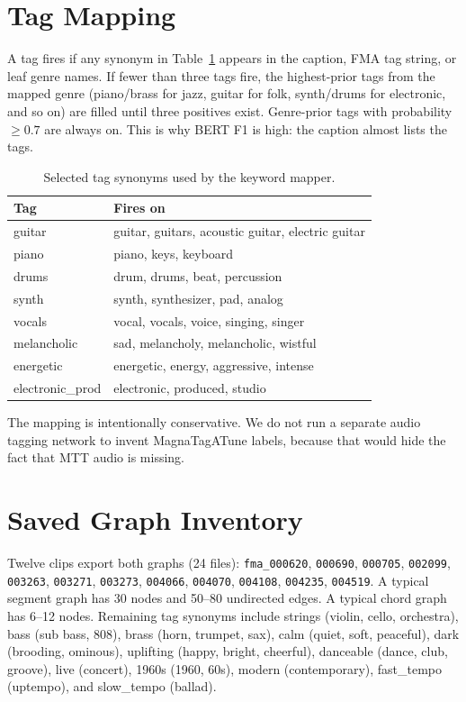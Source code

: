 \documentclass[conference]{IEEEtran}
\begin{document}
\section{Tag Mapping}
A tag fires if any synonym in Table~\ref{tab:syn} appears in the caption, FMA tag string, or leaf genre names. If fewer than three tags fire, the highest-prior tags from the mapped genre (piano/brass for jazz, guitar for folk, synth/drums for electronic, and so on) are filled until three positives exist. Genre-prior tags with probability $\ge 0.7$ are always on. This is why BERT F1 is high: the caption almost lists the tags.

\begin{table}[t]
\caption{Selected tag synonyms used by the keyword mapper.}
\label{tab:syn}
\centering
\scriptsize
\begin{tabular}{lp{5.6cm}}
\toprule
Tag & Fires on \\
\midrule
guitar & guitar, guitars, acoustic guitar, electric guitar \\
piano & piano, keys, keyboard \\
drums & drum, drums, beat, percussion \\
synth & synth, synthesizer, pad, analog \\
vocals & vocal, vocals, voice, singing, singer \\
melancholic & sad, melancholy, melancholic, wistful \\
energetic & energetic, energy, aggressive, intense \\
electronic\_prod & electronic, produced, studio \\
\bottomrule
\end{tabular}
\end{table}

The mapping is intentionally conservative. We do not run a separate audio tagging network to invent MagnaTagATune labels, because that would hide the fact that MTT audio is missing.

\section{Saved Graph Inventory}
Twelve clips export both graphs (24 files):
\texttt{fma\_000620}, \texttt{000690}, \texttt{000705}, \texttt{002099}, \texttt{003263}, \texttt{003271}, \texttt{003273}, \texttt{004066}, \texttt{004070}, \texttt{004108}, \texttt{004235}, \texttt{004519}.
A typical segment graph has 30 nodes and 50--80 undirected edges. A typical chord graph has 6--12 nodes. Remaining tag synonyms include strings (violin, cello, orchestra), bass (sub bass, 808), brass (horn, trumpet, sax), calm (quiet, soft, peaceful), dark (brooding, ominous), uplifting (happy, bright, cheerful), danceable (dance, club, groove), live (concert), 1960s (1960, 60s), modern (contemporary), fast\_tempo (uptempo), and slow\_tempo (ballad).
\end{document}
